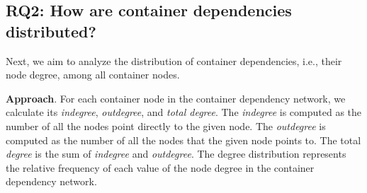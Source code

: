\documentclass[sigconf]{acmart}
\begin{document}
\subsection{RQ2: How are container dependencies distributed?}
Next, we aim to analyze the distribution of container dependencies, i.e., their node degree, among all container nodes. 


\noindent\textbf{Approach}. 
For each container node in the container dependency network, 
we calculate its \emph{indegree}, \emph{outdegree}, and \emph{total degree}. The \emph{indegree} is computed as the number of all the nodes point directly to the given node. The \emph{outdegree} is computed as the number of all the nodes that the given node points to. The total \emph{degree} is the sum of \emph{indegree} and \emph{outdegree}. The degree distribution represents the relative frequency of each value of the node degree in the container dependency network.


\end{document}
